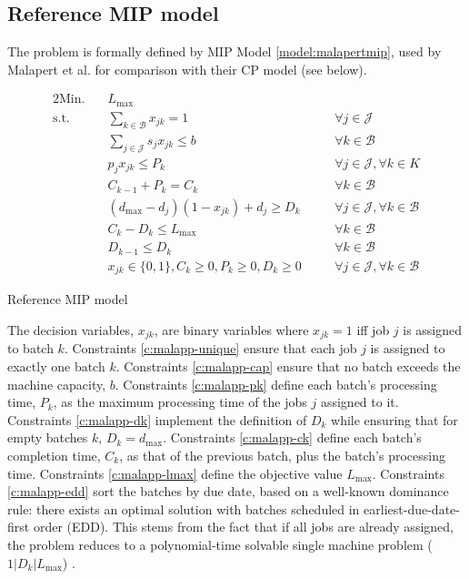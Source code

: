 \documentclass[oribibl]{llncs}
\def\Lmax{{L_{\mathrm{max}}}}
\begin{document}
\subsection{Reference MIP model} The problem is formally defined by MIP
Model \ref{model:malapertmip}, used by Malapert et al. \cite{Malapert} for comparison
with their CP model (see below).

\begin{model}[h]
\begin{alignat}{2}
\mathrm{Min.}\quad & \Lmax && \\
\mathrm{s.t.}\quad &\sum_{k \in \mathcal{B}} x_{jk} = 1 \quad && \forall j \in \mathcal{J}
\label{c:malapp-unique}\\
  &\sum_{j \in \mathcal{J}} s_j x_{jk} \leq b \quad && \forall k \in \mathcal{B}\label{c:malapp-cap}\\
  &p_j x_{jk} \leq P_k \quad && \forall j \in \mathcal{J}, \forall k \in
  K\label{c:malapp-pk}\\
  &C_{k-1} + P_{k} = C_k \quad && \forall k \in \mathcal{B}\label{c:malapp-ck}\\
  &(d_\mathrm{max} - d_j)(1 - x_{jk}) + d_j \geq D_k \quad && \forall j \in \mathcal{J}, \forall
  k \in \mathcal{B}\label{c:malapp-dk}\\
&C_k - D_k \leq \Lmax \quad && \forall k \in \mathcal{B}\label{c:malapp-lmax}\\
  &D_{k-1} \leq D_k \quad && \forall k \in \mathcal{B} \label{c:malapp-edd} \\%
  &x_{jk} \in \{0,1\}, C_k \geq 0, P_k \geq 0, D_k \geq 0 \quad && \forall j \in \mathcal{J}, \forall k \in \mathcal{B}  
\end{alignat}
\caption{Reference MIP model}
\label{model:malapertmip}
\end{model}

The decision variables, $x_{jk}$, are binary variables where $x_{jk}=1$
iff job $j$ is assigned to batch $k$. Constraints
\eqref{c:malapp-unique} ensure that each job $j$ is assigned to exactly
one batch $k$. Constraints \eqref{c:malapp-cap} ensure that no batch
exceeds the machine capacity, $b$. Constraints \eqref{c:malapp-pk}
define each batch's processing time, $P_k$, as the maximum processing time
of the jobs $j$ assigned to it. Constraints \eqref{c:malapp-dk} implement the
definition of $D_k$ while ensuring that for empty batches $k$, $D_k = d_\text{max}$.
Constraints \eqref{c:malapp-ck} define
each batch's completion time, $C_k$, as that of the previous batch, plus
the batch's processing time. Constraints \eqref{c:malapp-lmax} define
the objective value $\Lmax$. Constraints \eqref{c:malapp-edd} sort the
batches by due date, based on a well-known dominance rule: there exists
an optimal solution with batches scheduled in earliest-due-date-first
order (EDD). This stems from the fact that if all jobs are already 
assigned, the problem reduces to a polynomial-time solvable single machine
problem ($1|D_k|\Lmax$) \cite{Pinedo03}.
\end{document}
